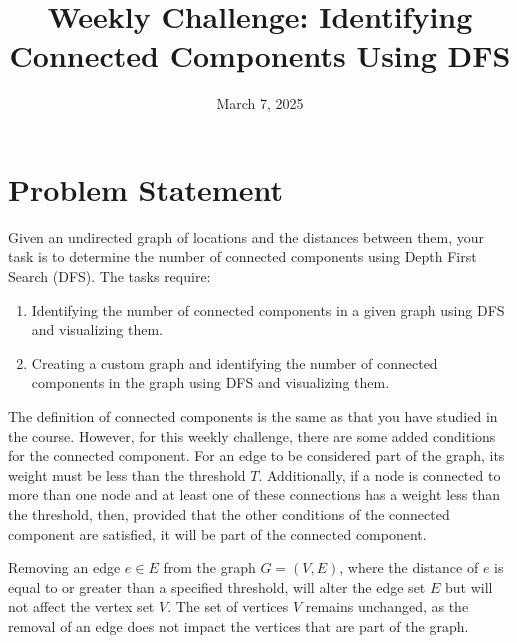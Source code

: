 \documentclass{article}
\title{Weekly Challenge: Identifying Connected Components Using DFS}
\date{March 7, 2025}
\begin{document}
\maketitle

\section{Problem Statement}
Given an undirected graph of locations and the distances between them, your task is to determine the number of connected components using Depth First Search (DFS). The tasks require:

\begin{enumerate}
    \item Identifying the number of connected components in a given graph using DFS and visualizing them.
    \item Creating a custom graph and identifying the number of connected components in the graph using DFS and visualizing them.
\end{enumerate}
The definition of connected components is the same as that you have studied in the course. However, for this weekly challenge, there are some added conditions for the connected component. For an edge to be considered part of the graph, its weight must be less than the threshold $T$. Additionally, if a node is connected to more than one node and at least one of these connections has a weight less than the threshold, then, provided that the other conditions of the connected component are satisfied, it will be part of the connected component.

Removing an edge \( e \in E \) from the graph \( G = (V, E) \), where the distance of \( e \) is equal to or greater than a specified threshold, will alter the edge set \( E \) but will not affect the vertex set \( V \). The set of vertices \( V \) remains unchanged, as the removal of an edge does not impact the vertices that are part of the graph.
\end{document}
